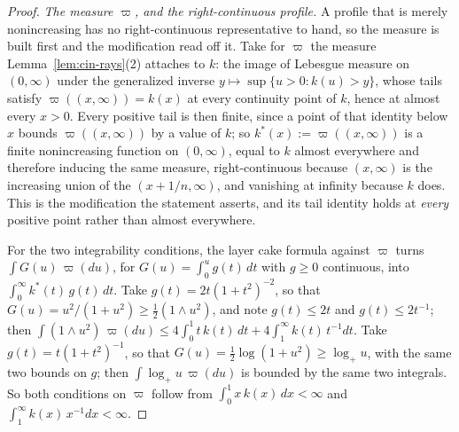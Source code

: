 \begin{proof}
\emph{The measure $\varpi$, and the right-continuous profile.} A profile that is merely
nonincreasing has no right-continuous representative to hand, so the measure is built first and
the modification read off it. Take for $\varpi$ the measure Lemma~\ref{lem:cin-rays}(2)
attaches to $k$: the image of Lebesgue measure on $(0,\infty)$ under the generalized inverse
$y \mapsto \sup\{u > 0 : k(u) > y\}$, whose tails satisfy $\varpi((x,\infty)) = k(x)$ at every
continuity point of $k$, hence at almost every $x > 0$. Every positive tail is then finite,
since a point of that identity below $x$ bounds $\varpi((x,\infty))$ by a value of $k$; so
$k^{\ast}(x) := \varpi((x,\infty))$ is a finite nonincreasing function on $(0,\infty)$, equal to
$k$ almost everywhere and therefore inducing the same \Levy{} measure, right-continuous because
$(x,\infty)$ is the increasing union of the $(x + 1/n,\infty)$, and vanishing at infinity
because $k$ does. This is the modification the statement asserts, and its tail identity holds at
\emph{every} positive point rather than almost everywhere.

For the two integrability conditions, the layer cake formula against $\varpi$ turns
$\int G(u)\,\varpi(du)$, for $G(u) = \int_0^u g(t)\,dt$ with $g \ge 0$ continuous, into
$\int_0^\infty k^{\ast}(t)\,g(t)\,dt$. Take $g(t) = 2t(1+t^2)^{-2}$, so that
$G(u) = u^2/(1+u^2) \ge \tfrac12 (1 \wedge u^2)$, and note $g(t) \le 2t$ and
$g(t) \le 2t^{-1}$; then
$\int (1 \wedge u^2)\,\varpi(du) \le 4\int_0^1 t\,k(t)\,dt + 4\int_1^\infty k(t)\,t^{-1}dt$.
Take $g(t) = t(1+t^2)^{-1}$, so that $G(u) = \tfrac12\log(1+u^2) \ge \log_+ u$, with the same
two bounds on $g$; then $\int \log_+ u\,\varpi(du)$ is bounded by the same two integrals. So
both conditions on $\varpi$ follow from $\int_0^1 x\,k(x)\,dx < \infty$ and
$\int_1^\infty k(x)\,x^{-1}dx < \infty$.


\end{proof}
